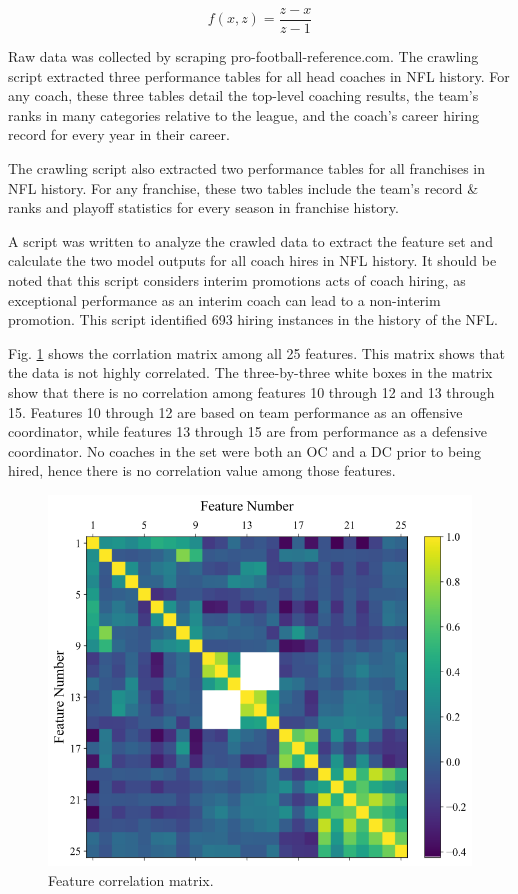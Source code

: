 \documentclass[conference]{IEEEtran}
\begin{document}
\begin{equation}
        f(x,z) = \frac{z-x}{z-1}
        \label{eq3}
\end{equation}

Raw data was collected by scraping pro-football-reference.com. The crawling script extracted three performance tables for all head coaches in NFL history. For any coach, these three tables detail the top-level coaching results, the team's ranks in many categories relative to the league, and the coach's career hiring record for every year in their career. 

The crawling script also extracted two performance tables for all franchises in NFL history. For any franchise, these two tables include the team's record \& ranks and playoff statistics for every season in franchise history.

A script was written to analyze the crawled data to extract the feature set and calculate the two model outputs for all coach hires in NFL history. It should be noted that this script considers interim promotions acts of coach hiring, as exceptional performance as an interim coach can lead to a non-interim promotion. This script identified 693 hiring instances in the history of the NFL.

Fig. \ref{fig1} shows the corrlation matrix among all 25 features. This matrix shows that the data is not highly correlated. The three-by-three white boxes in the matrix show that there is no correlation among features 10 through 12 and 13 through 15. Features 10 through 12 are based on team performance as an offensive coordinator, while features 13 through 15 are from performance as a defensive coordinator. No coaches in the set were both an OC and a DC prior to being hired, hence there is no correlation value among those features. 

\begin{figure}[htbp]
\centerline{\includegraphics[width=1\linewidth]{corr.png}}
\caption{Feature correlation matrix.}
\label{fig1}
\end{figure}
\end{document}
